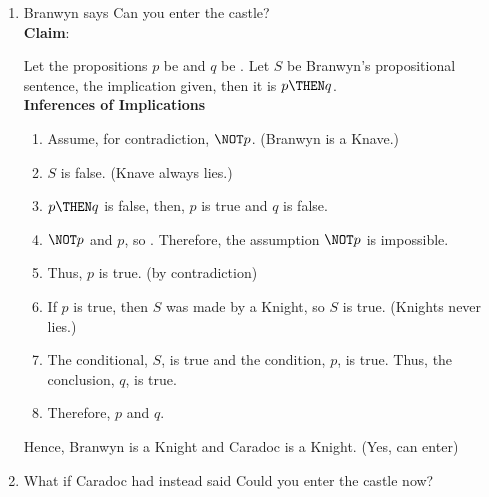 \begin{enumerate}
  \begin{enumerate}
  \item
  Branwyn says 
  Can you enter the castle?\\

  {\color{redcolor}\textbf{Claim}: }
  \begin{subprove}
    Let the propositions \(p\) be  and 
    \(q\) be . Let \(S\) be Branwyn's propositional 
    sentence, the implication given, then it is \(p \THEN q\).\\
    \textbf{Inferences of Implications}
    \begin{enumerate}
      \item Assume, for contradiction, \(\NOT p\). (Branwyn is a Knave.)
      \item \(S\) is false. (Knave always lies.)
      \item \(p \THEN q\) is false, then, \(p\) is true and \(q\) is false.
      \item \(\NOT p\) and \(p\), so \FALSE. Therefore, the assumption \(\NOT p\) is impossible.
      \item Thus, \(p\) is true. (by contradiction)
      \item If \(p\) is true, then \(S\) was made by a Knight, so \(S\) is true. (Knights never lies.)
      \item The conditional, \(S\), is true and the condition, \(p\), is true. Thus, the conclusion, $q$, is true.
      \item Therefore, \(p\) and \(q\).
    \end{enumerate}
    Hence, Branwyn is a Knight and Caradoc is a Knight. (Yes, can enter)
  \end{subprove}


  \item What if Caradoc had instead said 
  Could you enter the castle now?\\


\end{enumerate}
\end{enumerate}
